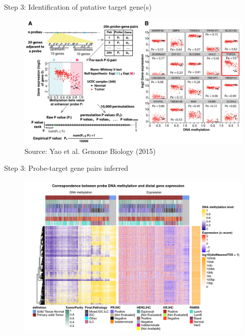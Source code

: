 \documentclass[slidestop,compress,11pt,xcolor=dvipsnames]{beamer}
\begin{document}
\begin{frame}{Step 3: Identification of putative target gene(s)}
 \vspace*{-0.4cm}
 \begin{figure}
\hspace*{-0.5cm}
\includegraphics[width=1.1\linewidth]{ELMER/pair.png}{\tiny{\\\vspace{-0.3cm}Source: Yao et al. Genome Biology (2015)}}
 \end{figure}
\end{frame}




\begin{frame}{Step 3: Probe-target gene pairs inferred}
 \vspace*{-0.3cm}
 \begin{figure}
  \centering
  \includegraphics[width=1.0\linewidth]{ELMER/heatmappair.jpg}
 \end{figure}
\end{frame}
\end{document}
